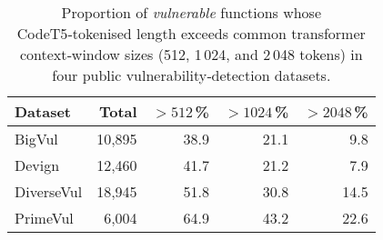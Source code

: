 \begin{table}[ht]
  \centering
  \caption{Proportion of \emph{vulnerable} functions whose CodeT5‑tokenised length exceeds common transformer context‑window sizes (512, 1\,024, and 2\,048 tokens) in four public vulnerability‑detection datasets.\label{tab:token-cutoffs}}
  \begin{tabular}{lrrrr}
    \toprule
    Dataset & Total & $>512$\,\%  & $>1024$\,\%  & $>2048$\,\% \\
    \midrule
    BigVul & 10,895 & 38.9 & 21.1 & 9.8 \\
    Devign & 12,460 & 41.7 & 21.2 & 7.9 \\
    DiverseVul & 18,945 & 51.8 & 30.8 & 14.5 \\
    PrimeVul & 6,004 & 64.9 & 43.2 & 22.6 \\
    \bottomrule
  \end{tabular}
\end{table}